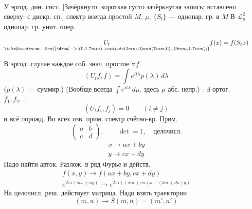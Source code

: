  
У эргод. дин. сист.
[Зачёркнуто: короткая густо зачёркнутая запись; вставлено сверху: с дискр. сп.]
спектр всегда простой
$M$, $\mu$, $\{S_t\}$ --- однопар. гр. в $M$
В $\mathcal L^2_\mu$
однопар. гр. унит. опер.
\par\noindent\begin{minipage}{\linewidth}
\begin{equation*}
\underset{\tikz[baseline=-.5ex]{\draw[->] (0,1.7mm) .. controls (2mm,0) and (7mm,0) .. (9mm,1.7mm);}}{U_t}f(x)=f(S_t x)
\end{equation*}
\end{minipage}\par
В эргод. случае каждое соб. знач. простое
$\forall f$
\begin{equation*}
(U_t f,f)=\int e^{it\lambda}p(\lambda)\,d\lambda
\end{equation*}
($p(\lambda)$ --- суммир.)
(Вообще всегда $\int e^{it\lambda}\,d\mu$, здесь $\mu$ абс. непр.)
:
$\exists$ ортог. $f_1,f_2,\ldots$
\begin{equation*}
(U_t f_i,f_j)=0\qquad(i\neq j)
\end{equation*}
и всё порожд.
Во всех изв. прим. спектр счётно-кр.
\underline{Прим.} 
\begin{equation*}
\begin{pmatrix}a&b\\c&d\end{pmatrix},
\qquad \det=1,\quad\text{целочисл.}
\end{equation*}
\begin{gather*}
x\longrightarrow ax+by\\
y\longrightarrow cx+dy
\end{gather*}
Надо найти авток. Разлож. в ряд Фурье и действ.
\begin{gather*}
f(x,y)\longrightarrow f(ax+by,cx+dy)\\
e^{2\pi i(mx+ny)}
\longrightarrow e^{2\pi i((am+cn)x+(bm+dn)y)}
\end{gather*}
На целочисл. реш. действует матрица.
Надо взять траектории
\begin{equation*}
(m,n)\longrightarrow S(m,n)=(m',n')
\end{equation*}
